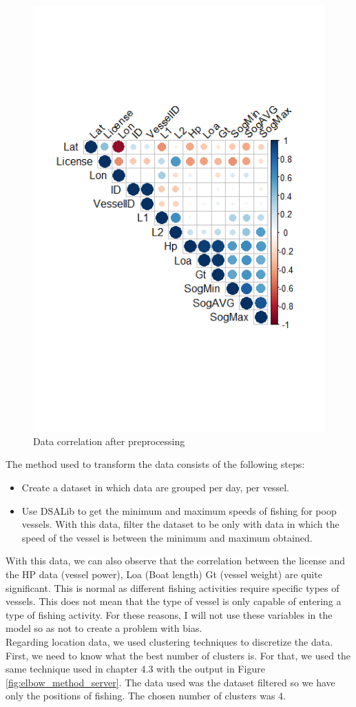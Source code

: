\begin{figure}[h]
    \centering
    \includegraphics[width=0.7\linewidth]{Chapters/img/data_coor2.png}
    \caption{Data correlation after preprocessing}
    \label{fig:data_coor2}
\end{figure}
\newpage
The method used to transform the data consists of the following steps:
\begin{itemize}
\item    Create a dataset in which data are grouped per day, per vessel.
\item    Use DSALib to get the minimum and maximum speeds of fishing for poop vessels. With this data, filter the dataset to be only with data in which the speed of the vessel is between the minimum and maximum obtained.

\end{itemize}

With this data, we can also observe that the correlation between the license and the HP data (vessel power), Loa (Boat length) Gt (vessel weight) are quite significant. This is normal as different fishing activities require specific types of vessels. This does not mean that the type of vessel is only capable of entering a type of fishing activity.
For these reasons, I will not use these variables in the model so as not to create a problem with bias.
\\
Regarding location data, we used clustering techniques to discretize the data.
First, we need to know what the best number of clusters is. For that, we used the same technique used in chapter 4.3 with the output in Figure \ref{fig:elbow_method_server}. The data used was the dataset filtered so we have only the positions of fishing. The chosen number of clusters was 4.

